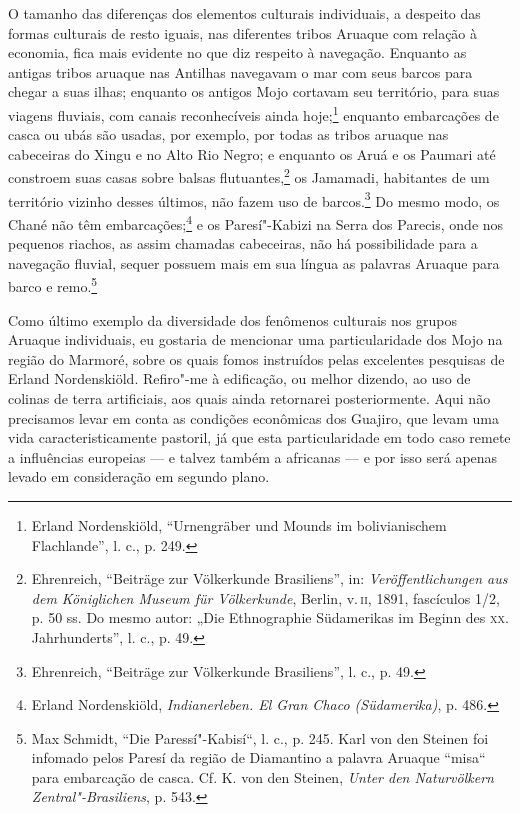 O tamanho das diferenças dos elementos culturais individuais, a
despeito das formas culturais de resto iguais, nas diferentes tribos
Aruaque com relação à economia, fica mais evidente no que diz respeito
à navegação. Enquanto as antigas tribos aruaque nas Antilhas navegavam
o mar com seus barcos para chegar a suas ilhas; enquanto os antigos Mojo
cortavam seu território, para suas viagens fluviais, com canais
reconhecíveis ainda hoje;\footnote{Erland Nordenskiöld, ``Urnengräber
  und Mounds im bolivianischem Flachlande'', l. c., p. 249.} enquanto
embarcações de casca ou ubás são usadas, por exemplo, por todas as
tribos aruaque nas cabeceiras do Xingu e no Alto Rio Negro; e enquanto
os Aruá e os Paumari até constroem suas casas sobre balsas
flutuantes,\footnote{Ehrenreich, ``Beiträge zur Völkerkunde Brasiliens'',
  in: \emph{Veröffentlichungen aus dem Königlichen Museum für
  Völkerkunde}, Berlin, v.\,\textsc{ii}, 1891, fascículos 1/2, p. 50 ss. Do mesmo
  autor: „Die Ethnographie Südamerikas im Beginn des \textsc{xx}.
  Jahrhunderts'', l. c., p. 49.} os Jamamadi, habitantes de um
território vizinho desses últimos, não fazem uso de barcos.\footnote{Ehrenreich,
  ``Beiträge zur Völkerkunde Brasiliens'', l. c., p. 49.} Do mesmo
modo, os Chané não têm embarcações;\footnote{Erland Nordenskiöld,
  \emph{Indianerleben. El Gran Chaco (Südamerika)}, p. 486.} e os
Paresí"-Kabizi na Serra dos Parecis, onde nos pequenos riachos, as assim
chamadas cabeceiras, não há possibilidade para a navegação fluvial,
sequer possuem mais em sua língua as palavras Aruaque para barco e
remo.\footnote{Max Schmidt, ``Die Paressí"-Kabisí``, l. c., p. 245. Karl
  von den Steinen foi infomado pelos Paresí da região de Diamantino a
  palavra Aruaque ``misa`` para embarcação de casca. Cf. K. von den
  Steinen, \emph{Unter den Naturvölkern Zentral"-Brasiliens}, p. 543.}

Como último exemplo da diversidade dos fenômenos culturais nos grupos
Aruaque individuais, eu gostaria de mencionar uma particularidade dos
Mojo na região do Marmoré, sobre os quais fomos instruídos pelas
excelentes pesquisas de Erland Nordenskiöld. Refiro"-me à edificação, ou
melhor dizendo, ao uso de colinas de terra artificiais, aos quais ainda
retornarei posteriormente. Aqui não precisamos levar em conta as
condições econômicas dos Guajiro, que levam uma vida
caracteristicamente pastoril, já que esta particularidade em todo caso
remete a influências europeias --- e talvez também a africanas --- e por
isso será apenas levado em consideração em segundo plano.

